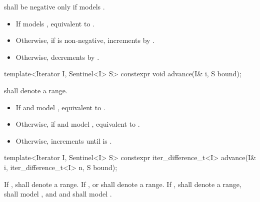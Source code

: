 \begin{addedblock}
\begin{itemdescr}
\pnum
\expects
{} shall be negative only if
 models .

\pnum
\effects
\begin{itemize}
\item If  models ,
  equivalent to .
\item Otherwise, if  is non-negative, increments
   by .
\item Otherwise, decrements  by .
\end{itemize}
\end{itemdescr}

%
\begin{itemdecl}
template<Iterator I, Sentinel<I> S>
  constexpr void advance(I& i, S bound);
\end{itemdecl}

\begin{itemdescr}
\pnum
\expects
{} shall denote a range.

\pnum
\effects
\begin{itemize}
\item If  and  model ,
  equivalent to .
\item Otherwise, if  and  model ,
  equivalent to .
\item Otherwise, increments  until
   is .
\end{itemize}
\end{itemdescr}

%
\begin{itemdecl}
template<Iterator I, Sentinel<I> S>
  constexpr iter_difference_t<I> advance(I& i, iter_difference_t<I> n, S bound);
\end{itemdecl}

\begin{itemdescr}
\pnum
\expects
If ,  shall denote a range.
If ,  or  shall denote a range.
If ,  shall denote a range,
 shall model , and
 and  shall model .


\end{itemdescr}
\end{addedblock}

